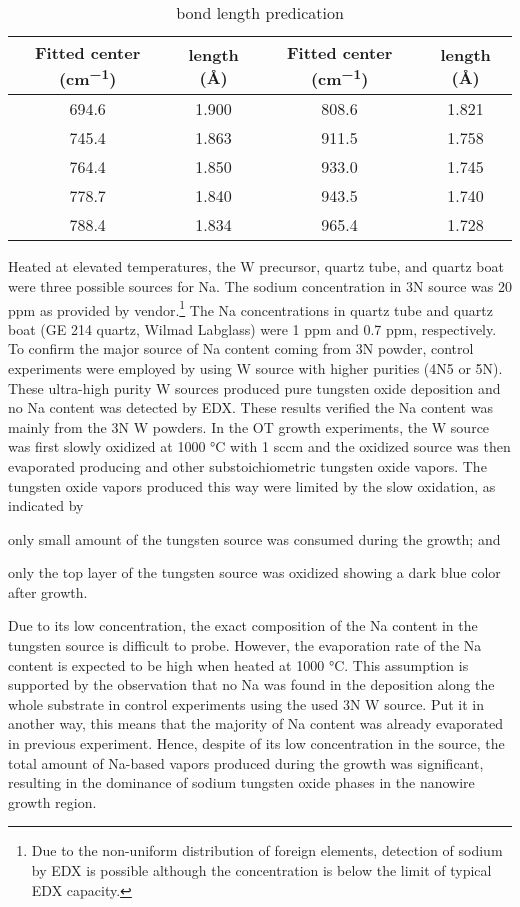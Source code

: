 \begin{table}[htb]
\centering
\caption{ bond length predication}\label{tab:nawobond}
\begin{tabular}{cccc}
\toprule
Fitted center (\si{cm^{-1}}) & length (\AA) & Fitted center (\si{cm^{-1}}) & length (\AA) \\
\midrule
694.6 & 1.900 &  808.6 &  1.821 \\
745.4 & 1.863 &  911.5 &  1.758 \\
764.4 & 1.850 &  933.0 &  1.745 \\
778.7 & 1.840 &   943.5 & 1.740 \\
788.4 & 1.834 &   965.4 & 1.728 \\
\bottomrule
\end{tabular}
\end{table}

Heated at elevated temperatures, the W precursor, quartz tube, and quartz boat were three possible sources for Na. The sodium concentration in 3N source was 20 ppm as provided by vendor.\footnote{Due to the non-uniform distribution of foreign elements, detection of sodium by EDX is possible although the concentration is below the limit of typical EDX capacity.} The Na concentrations in quartz tube and quartz boat (GE 214 quartz, Wilmad Labglass) were 1 ppm and 0.7 ppm, respectively. To confirm the major source of Na content coming from 3N powder, control experiments were employed by using W source with higher purities (4N5 or 5N). These ultra-high purity W sources produced pure tungsten oxide deposition and no Na content was detected by EDX. These results verified the Na content was mainly from the 3N W powders. In the OT growth experiments, the W source was first slowly oxidized at 1000 \si{\degreeCelsius} with 1 sccm  and the oxidized source was then evaporated producing  and other substoichiometric tungsten oxide vapors. The tungsten oxide vapors produced this way were limited by the slow oxidation, as indicated by
\begin{enumerate*}[label=\itshape\alph*\upshape)]
\item only small amount of the tungsten source was consumed during the growth; and
\item only the top layer of the tungsten source was oxidized showing a dark blue color after growth.
\end{enumerate*} Due to its low concentration, the exact composition of the Na content in the tungsten source is difficult to probe. However, the evaporation rate of the Na content is expected to be high when heated at 1000 \si{\degreeCelsius}. This assumption is supported by the observation that no Na was found in the deposition along the whole substrate in control experiments using the used 3N W source. Put it in another way, this means that the majority of Na content was already evaporated in previous experiment. Hence, despite of its low concentration in the source, the total amount of Na-based vapors produced during the growth was significant, resulting in the dominance of sodium tungsten oxide phases in the nanowire growth region.

